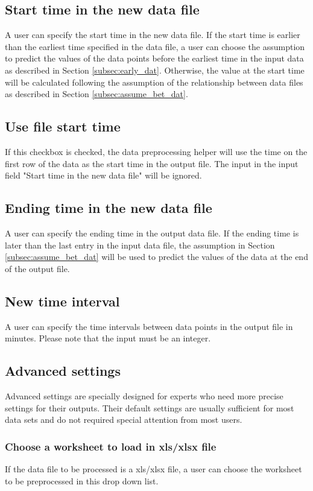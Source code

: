 \documentclass[12pt,a4paper]{article}
\begin{document}
\subsection{Start time in the new data file}
A user can specify the start time in the new data file.
If the start time is earlier than the earliest time specified in the data file, a user can choose the assumption to predict the values of the data points before the earliest time in the input data as described in Section \ref{subsec:early_dat}.
Otherwise, the value at the start time will be calculated following the assumption of the relationship between data files as described in Section \ref{subsec:assume_bet_dat}.

\subsection{Use file start time}
If this checkbox is checked, the data preprocessing helper will use the time on the first row of the data as the start time in the output file.
The input in the input field "Start time in the new data file" will be ignored.

\subsection{Ending time in the new data file}
A user can specify the ending time in the output data file.
If the ending time is later than the last entry in the input data file, the assumption in Section \ref{subsec:assume_bet_dat} will be used to predict the values of the data at the end of the output file.

\subsection{New time interval}
A user can specify the time intervals between data points in the output file in minutes.
Please note that the input must be an integer.

\subsection{Advanced settings}
Advanced settings are specially designed for experts who need more precise settings for their outputs.
 Their default settings are usually sufficient for most data sets and do not required special attention from most users.

\subsubsection{Choose a worksheet to load in xls/xlsx file}
If the data file to be processed is a xls/xlsx file, a user can choose the worksheet to be preprocessed in this drop down list.
\end{document}
